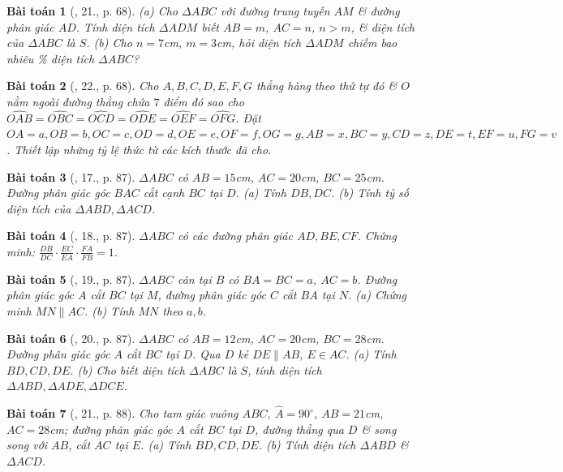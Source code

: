 \documentclass{article}
\newtheorem{baitoan}{Bài toán}
\begin{document}
\begin{baitoan}[\cite{SGK_Toan_8_tap_2}, 21., p. 68]
	(a) Cho $\Delta ABC$ với đường trung tuyến $AM$ \& đường phân giác $AD$. Tính diện tích $\Delta ADM$ biết $AB = m$, $AC = n$, $n > m$, \& diện tích của $\Delta ABC$ là $S$. (b) Cho $n = 7$\emph{cm}, $m = 3$\emph{cm}, hỏi diện tích $\Delta ADM$ chiếm bao nhiêu \% diện tích $\Delta ABC$?
\end{baitoan}

\begin{baitoan}[\cite{SGK_Toan_8_tap_2}, 22., p. 68]
	Cho $A,B,C,D,E,F,G$ thẳng hàng theo thứ tự đó \& $O$ nằm ngoài đường thằng chứa $7$ điểm đó sao cho $\widehat{OAB} = \widehat{OBC} = \widehat{OCD} = \widehat{ODE} = \widehat{OEF} = \widehat{OFG}$. Đặt $OA = a, OB = b, OC = c, OD = d, OE = e, OF = f, OG = g, AB = x, BC = y, CD = z, DE = t, EF = u, FG = v$. Thiết lập những tỷ lệ thức từ các kích thước đã cho.
\end{baitoan}

\begin{baitoan}[\cite{SBT_Toan_8_tap_2}, 17., p. 87]
	$\Delta ABC$ có $AB = 15$\emph{cm}, $AC = 20$\emph{cm}, $BC = 25$\emph{cm}. Đường phân giác góc $BAC$ cắt cạnh $BC$ tại $D$. (a) Tính $DB,DC$. (b) Tính tỷ số diện tích của $\Delta ABD,\Delta ACD$.
\end{baitoan}

\begin{baitoan}[\cite{SBT_Toan_8_tap_2}, 18., p. 87]
	$\Delta ABC$ có các đường phân giác $AD,BE,CF$. Chứng minh: $\frac{DB}{DC}\cdot\frac{EC}{EA}\cdot\frac{FA}{FB} = 1$.
\end{baitoan}

\begin{baitoan}[\cite{SBT_Toan_8_tap_2}, 19., p. 87]
	$\Delta ABC$ cân tại $B$ có $BA = BC = a$, $AC = b$. Đường phân giác góc $A$ cắt $BC$ tại $M$, đường phân giác góc $C$ cắt $BA$ tại $N$. (a) Chứng minh $MN\parallel AC$. (b) Tính $MN$ theo $a,b$.
\end{baitoan}

\begin{baitoan}[\cite{SBT_Toan_8_tap_2}, 20., p. 87]
	$\Delta ABC$ có $AB = 12$\emph{cm}, $AC = 20$\emph{cm}, $BC = 28$\emph{cm}. Đường phân giác góc $A$ cắt $BC$ tại $D$. Qua $D$ kẻ $DE\parallel AB$, $E\in AC$. (a) Tính  $BD,CD,DE$. (b) Cho biết diện tích $\Delta ABC$ là $S$, tính diện tích $\Delta ABD,\Delta ADE,\Delta DCE$.
\end{baitoan}

\begin{baitoan}[\cite{SBT_Toan_8_tap_2}, 21., p. 88]
	Cho tam giác vuông $ABC$, $\widehat{A} = 90^\circ$, $AB = 21$\emph{cm}, $AC = 28$\emph{cm}; đường phân giác góc $A$ cắt $BC$ tại $D$, đường thẳng qua $D$ \& song song với $AB$, cắt $AC$ tại $E$. (a) Tính $BD,CD,DE$. (b) Tính diện tích $\Delta ABD$ \& $\Delta ACD$.
\end{baitoan}
\end{document}
